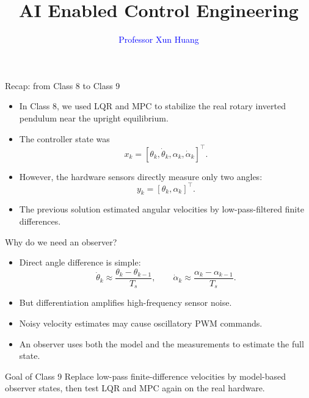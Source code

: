 \documentclass[aspectratio=169]{beamer}
\title{\textcolor{PKUTextBlue}{AI Enabled Control Engineering}}
\author{\textcolor{blue}{Professor Xun Huang}}
\institute{
Aeronautics and Astronautics\\
College of Engineering\\
Peking University\\[0.25cm]
huangxun@pku.edu.cn\\
https://xunger99.github.io/xunger/
}
\date{}
\begin{document}
\begin{frame}
\titlepage
\end{frame}

\begin{frame}{Recap: from Class 8 to Class 9}
\begin{itemize}
    \item In Class 8, we used LQR and MPC to stabilize the real rotary inverted pendulum near the upright equilibrium.
    \vspace{0.25cm}
    \item The controller state was
    \[
    x_k=[\theta_k,\dot\theta_k,\alpha_k,\dot\alpha_k]^\top.
    \]
    \vspace{0.25cm}
    \item However, the hardware sensors directly measure only two angles:
    \[
    y_k=[\theta_k,\alpha_k]^\top.
    \]
    \vspace{0.25cm}
    \item The previous solution estimated angular velocities by low-pass-filtered finite differences.
\end{itemize}
\end{frame}

\begin{frame}{Why do we need an observer?}
\begin{itemize}
    \item Direct angle difference is simple:
    \[
    \dot\theta_k\approx\frac{\theta_k-\theta_{k-1}}{T_s},\qquad
    \dot\alpha_k\approx\frac{\alpha_k-\alpha_{k-1}}{T_s}.
    \]

    \item But differentiation amplifies high-frequency sensor noise.

    \item Noisy velocity estimates may cause oscillatory PWM commands.
   
    \item An observer uses both the model and the measurements to estimate the full state.
\end{itemize}

\begin{block}{Goal of Class 9}
\small
Replace low-pass finite-difference velocities by model-based observer states, then test LQR and MPC again on the real hardware.
\end{block}
\end{frame}
\end{document}
